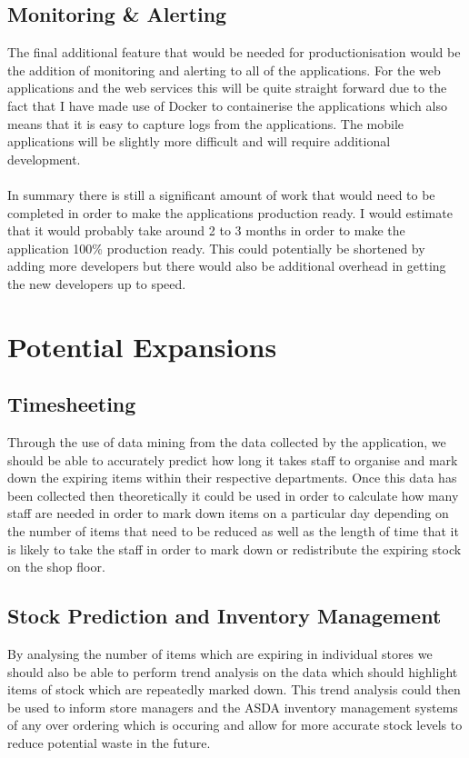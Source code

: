 \documentclass[a4paper,11pt]{report}
\begin{document}
\subsection{Monitoring \& Alerting}
The final additional feature that would be needed for productionisation would be the addition of monitoring and alerting to all of the applications. For the web applications and the web services this will be quite straight forward due to the fact that I have made use of Docker to containerise the applications which also means that it is easy to capture logs from the applications. The mobile applications will be slightly more difficult and will require additional development.
\\
\\
In summary there is still a significant amount of work that would need to be completed in order to make the applications production ready. I would estimate that it would probably take around 2 to 3 months in order to make the application 100\% production ready. This could potentially be shortened by adding more developers but there would also be additional overhead in getting the new developers up to speed.


\section{Potential Expansions}

\subsection{Timesheeting}
Through the use of data mining from the data collected by the application, we should be able to accurately predict
how long it takes staff to organise and mark down the expiring items within their respective departments. Once 
this data has been collected then theoretically it could be used in order to calculate how many staff are needed 
in order to mark down items on a particular day depending on the number of items that need to be reduced as well 
as the length of time that it is likely to take the staff in order to mark down or redistribute the expiring stock
on the shop floor. 

\subsection{Stock Prediction and Inventory Management}

By analysing the number of items which are expiring in individual stores we should also be able to perform trend 
analysis on the data which should highlight items of stock which are repeatedly marked down. This trend analysis 
could then be used to inform store managers and the ASDA inventory management systems of any over ordering which is 
occuring and allow for more accurate stock levels to reduce potential waste in the future.
\end{document}
